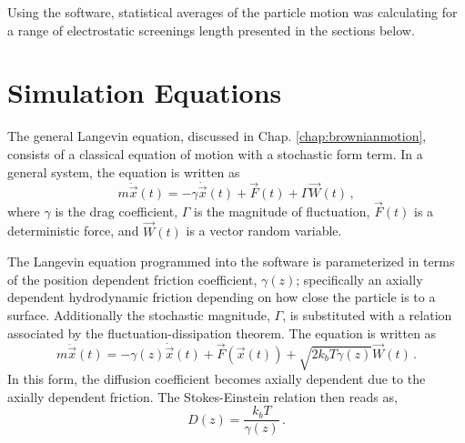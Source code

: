 Using the software, statistical averages of the particle motion was calculating for a range of electrostatic screenings length presented in the sections below. 

\section{Simulation Equations}

The general Langevin equation, discussed in Chap. \ref{chap:brownianmotion}, consists of a classical equation of motion with a stochastic form term. In a general system, the equation is written as
\begin{equation}
    m \ddot{\vec{x}}(t) = -\gamma \dot{\vec{x}}(t) + \vec{F}(t) + \Gamma \vec{W}(t)\,,
\end{equation}
where $\gamma$ is the drag coefficient, $\Gamma$ is the magnitude of fluctuation, $\vec{F}(t)$ is a deterministic force, and $\vec{W}(t)$ is a vector random variable. 

The Langevin equation programmed into the software is parameterized in terms of the position dependent friction coefficient, $\gamma(z)$; specifically an axially dependent hydrodynamic friction depending on how close the particle is to a surface. Additionally the stochastic magnitude, $\Gamma$, is substituted with a relation associated by the fluctuation-dissipation theorem. The equation is written as
\begin{equation}
    m\ddot{\vec{x}}(t) = - \gamma(z) \dot{\vec{x}}(t) + \vec F(\vec{x}(t)) + \sqrt{2k_b T \gamma(z)} \vec{W}(t)\,.
\end{equation}
In this form, the diffusion coefficient becomes axially dependent due to the axially dependent friction. The Stokes-Einstein relation then reads as,
\begin{equation}\label{eqn:stokes2}
    D(z) = \frac{k_b T}{\gamma(z)}\,.
\end{equation}

